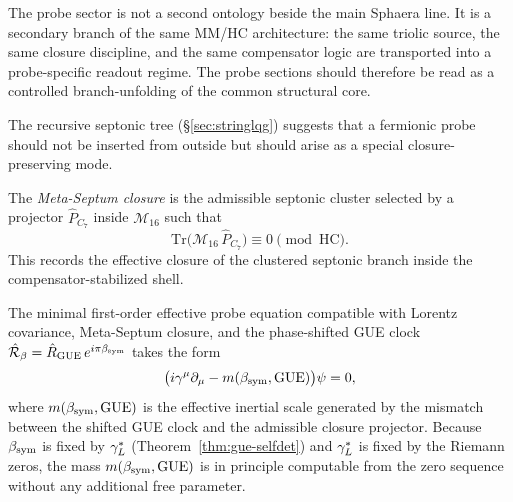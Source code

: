 \begin{remark}
The probe sector is not a second ontology beside the main Sphaera line.
It is a secondary branch of the same MM/HC architecture: the same
triolic source, the same closure discipline, and the same compensator
logic are transported into a probe-specific readout regime. The probe
sections should therefore be read as a controlled branch-unfolding of
the common structural core.
\end{remark}

\begin{remark}
The recursive septonic tree (§\ref{sec:stringlqg}) suggests that
a fermionic probe should not be inserted from outside but should arise
as a special closure-preserving mode.
\end{remark}

\begin{definition}
The \emph{Meta-Septum closure} is the admissible septonic cluster
selected by a projector $\hat P_{C_7}$ inside $\mathcal{M}_{16}$ such
that
\[
  \mathrm{Tr}\!\bigl(\mathcal{M}_{16}\,\hat P_{C_7}\bigr)
  \equiv 0\pmod{\mathrm{HC}}.
\]
This records the effective closure of the clustered septonic branch
inside the compensator-stabilized shell.
\end{definition}

\begin{theorem}\label{thm:dirac-probe}
The minimal first-order effective probe equation compatible with Lorentz
covariance, Meta-Septum closure, and the phase-shifted GUE clock
$\hat{\mathcal{R}}_\beta = \hat R_{\mathrm{GUE}}\,e^{i\pi\beta_{\mathrm{sym}}}$
takes the form
\[
  \bigl(i\gamma^\mu\partial_\mu
        - m(\beta_{\mathrm{sym}},\mathrm{GUE})\bigr)\psi = 0,
\]
where $m(\beta_{\mathrm{sym}},\mathrm{GUE})$ is the effective inertial scale generated
by the mismatch between the shifted GUE clock and the admissible closure
projector.
Because $\beta_{\mathrm{sym}}$ is fixed by $\gamma_L^*$ (Theorem~\ref{thm:gue-selfdet}) and
$\gamma_L^*$ is fixed by the Riemann zeros, the mass $m(\beta_{\mathrm{sym}},\mathrm{GUE})$
is in principle computable from the zero sequence without any additional
free parameter.
\end{theorem}

